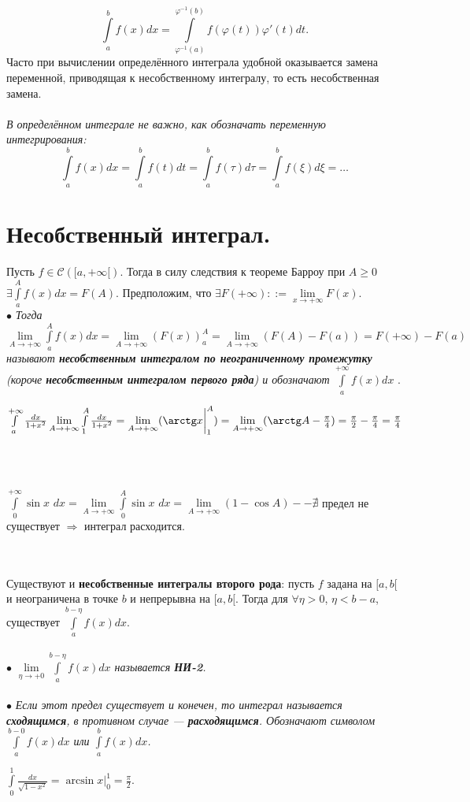 $$\int\limits_a^b f(x)dx = \int\limits_{\varphi^{-1}(a)}^{\varphi^{-1}(b)}f(\varphi(t))\varphi'(t)dt.$$
Часто при вычислении определённого интеграла удобной оказывается замена переменной, приводящая к несобственному интегралу, то есть несобственная замена.\\\\
\textit{В определённом интеграле не важно, как обозначать переменную интегрирования:\\
	$$\int\limits_a^b f(x)dx = \int\limits_a^b f(t)dt = \int\limits_a^b f(\tau)d\tau = \int\limits_a^b f(\xi)d\xi = \ldots$$}
\section{Несобственный интеграл.}
Пусть $f \in \mathcal{C}([a, +\infty[)$. Тогда в силу следствия к теореме Барроу при $A \geqslant 0$ $\exists \int\limits^A_a f(x)dx = F(A)$. Предположим, что $\exists F(+\infty)::=\lim\limits_{x\to +\infty} F(x) $.\\
$\bullet$ \textit{Тогда} $\lim\limits_{A\to +\infty}\int\limits_a^A f(x)dx = \lim\limits_{A\to +\infty}(F(x))_a^A = \lim\limits_{A\to +\infty}(F(A)-F(a)) =F(+\infty)-F(a) $ \textit{называют \textbf{несобственным интегралом по неограниченному промежутку} (короче \textbf{несобственным интегралом первого ряда}) и обозначают \textbf{$\int\limits_a^{+\infty}f(x)dx$} }.\\
\begin{example}
	$\int\limits_a^{+\infty} \frac{dx}{1+x^2} \lim\limits_{A\to +\infty} \int\limits_1^A \frac{dx}{1+x^2} = \lim\limits_{A\to +\infty}(\arctg x\bigg|_1^A) = \lim\limits_{A\to +\infty}(\arctg A- \frac{\pi}{4})= \frac{\pi}{2}- \frac{\pi}{4} = \frac{\pi}{4}$
\end{example}
\\\\
\begin{example}   
	$\int\limits_0^{+\infty} \sin x$ $dx = \lim\limits_{A\to +\infty} \int\limits_0^A \sin x$ $ dx = \lim\limits_{A\to +\infty} (1- \cos A) -- \nexists$ предел не существует $\Rightarrow$ интеграл расходится.
\end{example}
\\\\
Существуют и \textbf{несобственные интегралы второго рода}: пусть $f$ задана на $[a,b[$ и неограничена в точке $b$ и непрерывна на $[a,b[$. Тогда для $\forall \eta >0$, $\eta<b-a$, существует $\int\limits_a^{b-\eta}f(x)dx$.\\\\
$\bullet$ \textit{$\lim\limits_{\eta \to +0} \int\limits_a^{b-\eta}f(x)dx$ называется \textbf{НИ-2}.}\\\\
$\bullet$ \textit{Если этот предел существует и конечен, то интеграл называется \textbf{сходящимся}, в противном случае --- \textbf{расходящимся}. Обозначают символом $ \int\limits_a^{b-0}f(x)dx$ или $ \int\limits_a^{b}f(x)dx$.}\\
\begin{example}   
	$\int\limits_0^1 \frac{dx}{\sqrt{1-x^2}}= \arcsin{x}\bigg|_0^1 = \frac{\pi}{2}.$
\end{example}	
